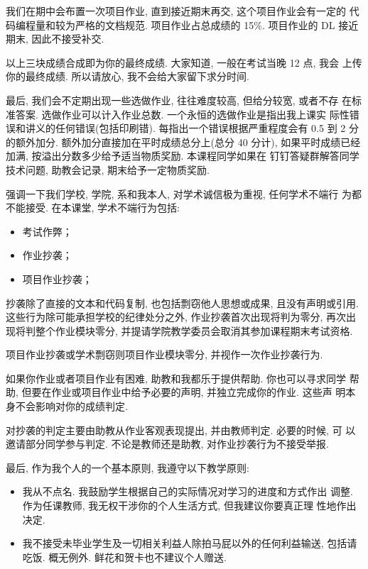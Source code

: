 \documentclass[a4paper]{ctexart}
\begin{document}
我们在期中会布置一次项目作业, 直到接近期末再交, 这个项目作业会有一定的
代码编程量和较为严格的文档规范. 项目作业占总成绩的 15\%. 项目作业的 DL
接近期末, 因此不接受补交. 

以上三块成绩合成即为你的最终成绩. 大家知道, 一般在考试当晚 12 点, 我会
上传你的最终成绩. 所以请放心, 我不会给大家留下求分时间.

最后, 我们会不定期出现一些选做作业, 往往难度较高, 但给分较宽, 或者不存
在标准答案. 选做作业可以计入作业总数. 一个永恒的选做作业是指出我上课实
际性错误和讲义的任何错误(包括印刷错). 每指出一个错误根据严重程度会有
0.5 到 2 分的额外加分. 额外加分直接加在平时成绩总分上(总分 40 分计),
如果平时成绩已经加满, 按溢出分数多少给予适当物质奖励. 本课程同学如果在
钉钉答疑群解答同学技术问题, 助教会记录, 期末给予一定物质奖励.

强调一下我们学校, 学院, 系和我本人, 对学术诚信极为重视, 任何学术不端行
为都不能接受. 在本课堂, 学术不端行为包括:

\begin{itemize}
\item 考试作弊；
\item 作业抄袭；
\item 项目作业抄袭；
\end{itemize}

抄袭除了直接的文本和代码复制, 也包括剽窃他人思想或成果, 
且没有声明或引用. 这些行为除可能承担学校的纪律处分之外, 
作业抄袭首次出现将判为零分, 再次出现将判整个作业模块零分, 
并提请学院教学委员会取消其参加课程期末考试资格.

项目作业抄袭或学术剽窃则项目作业模块零分, 并视作一次作业抄袭行为.

如果你作业或者项目作业有困难, 助教和我都乐于提供帮助. 你也可以寻求同学
帮助, 但要在作业或项目作业中给予必要的声明, 并独立完成你的作业. 这些声
明本身不会影响对你的成绩判定.

对抄袭的判定主要由助教从作业客观表现提出, 并由教师判定. 必要的时候, 可
以邀请部分同学参与判定. 不论是教师还是助教, 对作业抄袭行为不接受举报. 

最后, 作为我个人的一个基本原则, 我遵守以下教学原则:

\begin{itemize}
  \item 我从不点名. 我鼓励学生根据自己的实际情况对学习的进度和方式作出
    调整. 作为任课教师, 我无权干涉你的个人生活方式, 但我建议你要真正理
    性地作出决定.
  \item 我不接受未毕业学生及一切相关利益人除拍马屁以外的任何利益输送,
    包括请吃饭. 概无例外. 鲜花和贺卡也不建议个人赠送.  
\end{itemize}
\end{document}
